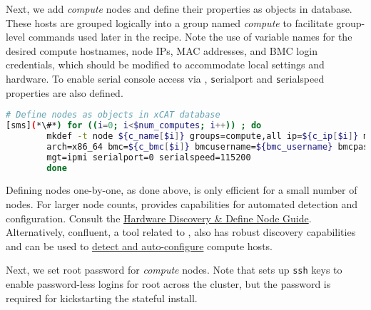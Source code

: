 
\noindent Next, we add {\em compute} nodes and define their properties as
objects in \xCAT{} database. 
These hosts are grouped logically into a group named {\em
compute} to facilitate group-level commands used later in the recipe.  Note the
use of variable names for the desired compute hostnames, node IPs, MAC
addresses, and BMC login credentials, which should be modified to accommodate
local settings and hardware. To enable serial console access via  \xCAT{}, 
{\texttt serialport} and {\texttt serialspeed}
properties are also defined.

\begin{lstlisting}[language=bash,keywords={},upquote=true,basicstyle=\footnotesize\ttfamily,]
# Define nodes as objects in xCAT database
[sms](*\#*) for ((i=0; i<$num_computes; i++)) ; do
		mkdef -t node ${c_name[$i]} groups=compute,all ip=${c_ip[$i]} mac=${c_mac[$i]} netboot=xnba \
		arch=x86_64 bmc=${c_bmc[$i]} bmcusername=${bmc_username} bmcpassword=${bmc_password} \
		mgt=ipmi serialport=0 serialspeed=115200 
        done
\end{lstlisting}

\begin{center}
  \begin{tcolorbox}[]
    \small 
Defining nodes one-by-one, as done above, is only efficient
for a small number of nodes. For larger node counts,
\xCAT{} provides capabilities for automated detection and
configuration.
Consult the
\href{http://xcat-docs.readthedocs.io/en/stable/guides/admin-guides/manage_clusters/ppc64le/discovery/}{\color{blue}\xCAT{}
Hardware Discovery \& Define Node Guide}. Alternatively, confluent, a tool
related to \xCAT{}, also has robust discovery capabilities and can be used to
\href{https://hpc.lenovo.com/users/documentation/confluentdisco.html}{\color{blue}detect
and auto-configure} compute hosts.  
\end{tcolorbox}
\end{center}

Next, we set root password for {\em compute} nodes. Note that \xCAT{} sets up
\texttt{ssh} keys to enable password-less logins for root across the cluster,
but the password is required for kickstarting the stateful install.

